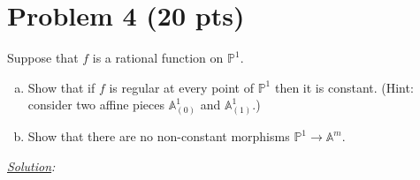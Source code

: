 \documentclass[12pt]{article}
\newcommand{\A}{\mathbb{A}}
\begin{document}
\newpage
















\section*{Problem 4 \small{(20 pts)}}
Suppose that $f$ is a rational function on $\mathbb{P}^1$.
\begin{enumerate}[(a)]
	\item Show that if $f$ is regular at every point of $\mathbb{P}^1$ then it is constant. (Hint: consider two affine pieces $\A_{(0)}^1$ and $\A^1_{(1)}$.)
	
	
	\item Show that there are no non-constant morphisms $\mathbb{P}^1 \to \A^m$.
\end{enumerate}



\noindent \textit{\underline{Solution}:}
\end{document}
